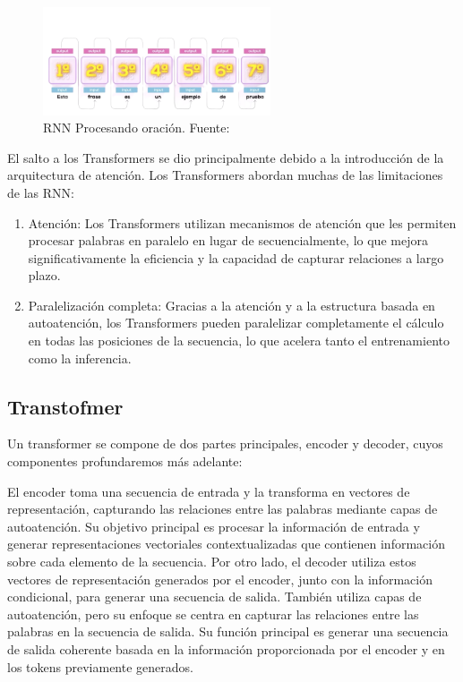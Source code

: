 \begin{figure}[H]
    \centering
    \includegraphics[width=0.6\textwidth]{plantilla-libro/img/rnn.png}
    \caption{RNN Procesando oración. Fuente: \cite{video-youtube}}
    \label{fig:rnn}
\end{figure}

El salto a los Transformers se dio principalmente debido a la introducción de la arquitectura de atención. Los Transformers abordan muchas de las limitaciones de las RNN:
\begin{enumerate}

\item Atención: Los Transformers utilizan mecanismos de atención que les permiten procesar palabras en paralelo en lugar de secuencialmente, lo que mejora significativamente la eficiencia y la capacidad de capturar relaciones a largo plazo.
\item Paralelización completa: Gracias a la atención y a la estructura basada en autoatención, los Transformers pueden paralelizar completamente el cálculo en todas las posiciones de la secuencia, lo que acelera tanto el entrenamiento como la inferencia.
\end{enumerate}








\subsection{Transtofmer}
Un transformer se compone de dos partes principales, encoder y decoder, cuyos componentes profundaremos más adelante:

 El encoder toma una secuencia de entrada y la transforma en vectores de representación, capturando las relaciones entre las palabras mediante capas de autoatención. Su objetivo principal es procesar la información de entrada y generar representaciones vectoriales contextualizadas que contienen información sobre cada elemento de la secuencia. Por otro lado, el decoder utiliza estos vectores de representación generados por el encoder, junto con la información condicional, para generar una secuencia de salida. También utiliza capas de autoatención, pero su enfoque se centra en capturar las relaciones entre las palabras en la secuencia de salida. Su función principal es generar una secuencia de salida coherente basada en la información proporcionada por el encoder y en los tokens previamente generados.

